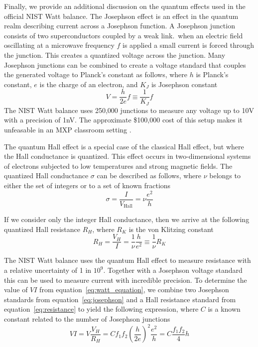 \documentclass[aps,prstab,reprint,12pt]{revtex4-1}
\begin{document}
Finally, we provide an additional discussion on the quantum effects used in the official NIST Watt balance. 
The Josephson effect is an effect in the quantum realm describing current across a Josephson function. A Josephson junction consists of two superconductors coupled by a weak link.\ 
when an electric field oscillating at a microwave frequency $f$ is applied a small current is forced through the junction. This creates a quantized voltage across the junction.
Many Josephson junctions can be combined to create a voltage standard that couples the generated voltage to Planck's constant as follows, where $h$ is Planck's constant, $e$ is the charge of an electron, and $K_J$ is Josephson constant
\begin{equation}\label{eq:josephson}
    V=\frac{h}{2e}f \equiv \frac{1}{K_J} f
\end{equation}
The NIST Watt balance uses 250,000 junctions to measure any voltage up to 10\si{V} with a precision of 1\si{nV}. The approximate \$100,000 cost of this setup makes it unfeasable in an MXP classroom setting \cite{Chao2015}.

The quantum Hall effect is a special case of the classical Hall effect, but where the Hall conductance is quantized. This effect occurs in two-dimensional systems of electrons subjected to low temperatures and strong magnetic fields. The quantized Hall conductance $\sigma$ can be described as follows, where $\nu$ belongs to either the set of integers or to a set of known fractions
\begin{equation}
    \sigma = \frac{I}{V_\mathrm{Hall}} = \nu \frac{e^2}{h}
\end{equation}

If we consider only the integer Hall conductance, then we arrive at the following quantized Hall resistance $R_H$, where $R_K$ is the von Klitzing constant
\begin{equation}\label{eq:resistance}
    R_H=\frac{V_H}{I}=\frac{1}{\nu}\frac{h}{e^2} \equiv \frac{1}{\nu} R_K
\end{equation}

The NIST Watt balance uses the quantum Hall effect to measure resistance with a relative uncertainty of 1 in $10^9$. Together with a Josephson voltage standard this can be used to measure current with incredible precision. To determine the value of $VI$ from equation~\ref{eq:watt_equation}, we combine two Josephson standards from equation~\ref{eq:josephson} and a Hall resistance standard from equation~\ref{eq:resistance} to yield the following expression, where $C$ is a known constant related to the number of Josephson junctions
\begin{equation}
    VI=V \frac{V_H}{R_H} = C f_1 f_2 \left(\frac{h}{2e}\right)^2 \frac{e^2}{h}=C \frac{f_1f_2}{4} h
\end{equation}
\end{document}

